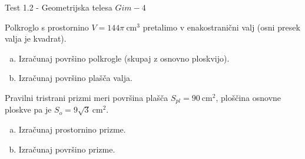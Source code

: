 \documentclass[a4paper,12pt]{letter}
\renewcommand{\headrulewidth}{3pt}
\renewcommand{\headrulewidth}{0.3pt}
\newcounter{tocke}
\begin{document}
\pagestyle{fancy}
\renewcommand\headrulewidth{0pt}
\lhead{}\chead{}\rhead{}
\rfoot{\vspace*{-2\baselineskip}}
\renewcommand{\vec}{\overrightarrow}
\def\programletnik{Gim - 4}
\def\naslov{Test 1.2 - }
\def\sklop{Geometrijska telesa}
\def\tockeA{4+6}
\def\tockeB{6+3}
\def\tockeC{5+4+3}
\def\tockeD{5+4}
\begin{minipage}{20cm}
\begin{bclogo}[couleur=brown!30,
  arrondi=0,ombre=true, couleurOmbre=gray!50,
logo =\bcplume,
  noborder=true]
{\textrm{{\Large{\naslov \sklop} \Huge{}
\large{} \hfill $\programletnik$}}}
\end{bclogo}
\end{minipage}
\begin{minipage}{20cm}
\begin{bclogo}[couleur=brown!30,
  arrondi=0,ombre=true, couleurOmbre=gray!50,
logo =\bcplume,
  noborder=true]
{\textrm{{}}}
\end{bclogo}
\end{minipage}

\begin{naloga}[\hfill $\tockeA$] \addtocounter{tocke}{\numexpr\tockeA\relax}
Polkroglo s prostornino $V=144\pi\ \text{cm}^3$ pretalimo v enakostrani\v{c}ni valj (osni presek valja je kvadrat).
\begin{enumerate}[a)]
\item Izra\v{c}unaj povr\v{s}ino polkrogle (skupaj z osnovno ploskvijo).
\item Izra\v{c}unaj povr\v{s}ino pla\v{s}\v{c}a valja.
\end{enumerate}
\end{naloga}\newpage

\begin{naloga}[\hfill $\tockeB$] \addtocounter{tocke}{\numexpr\tockeB\relax}
Pravilni tristrani prizmi meri povr\v{s}ina pla\v{s}\v{c}a $S_{pl}=90\ \text{cm}^2$, plo\v{s}\v{c}ina osnovne ploskve pa je $S_o=9\sqrt3\ \text{cm}^2$.
\begin{enumerate}[a)]
\item Izra\v{c}unaj prostornino prizme.
\item Izra\v{c}unaj povr\v{s}ino prizme.
\end{enumerate}
\end{naloga}\newpage
\end{document}
